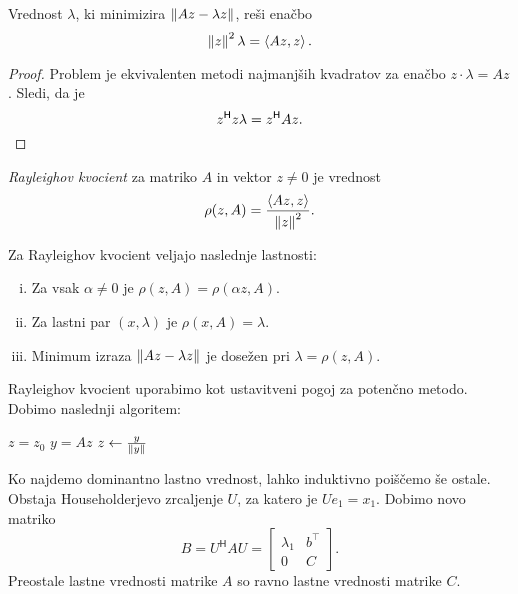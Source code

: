 \begin{trditev}
Vrednost $\lambda$, ki minimizira $\left\lVert Az - \lambda z\right\rVert$, reši
enačbo
\[
\left\lVert z\right\rVert^2 \lambda = \left\langle Az, z\right\rangle.
\]
\end{trditev}

\begin{proof}
Problem je ekvivalenten metodi najmanjših kvadratov za enačbo
$z \cdot \lambda = Az$. Sledi, da je
\[
z^\mathsf{H} z \lambda = z^\mathsf{H} Az. \qedhere
\]
\end{proof}

\begin{definicija}
\emph{Rayleighov kvocient} za matriko
$A$ in vektor $z \ne 0$ je vrednost
\[
\rho(z,A) = \frac{\left\langle Az,z\right\rangle}{\left\lVert z\right\rVert^2}.
\]
\end{definicija}

\begin{trditev}
Za Rayleighov kvocient veljajo naslednje lastnosti:

\begin{enumerate}[i)]
\item Za vsak $\alpha \ne 0$ je $\rho(z, A) = \rho(\alpha z, A)$.
\item Za lastni par $(x, \lambda)$ je $\rho(x, A) = \lambda$.
\item Minimum izraza $\left\lVert Az - \lambda z\right\rVert$ je dosežen pri
$\lambda = \rho(z, A)$.
\end{enumerate}
\end{trditev}

\obvs

\begin{opomba}
Rayleighov kvocient uporabimo kot ustavitveni pogoj za potenčno
metodo. Dobimo naslednji algoritem:

\begin{algorithmic}[1]
\State $z = z_0$
  \State $y = Az$
  \State $z \gets \frac{y}{\left\lVert y\right\rVert}$
\EndWhile
\end{algorithmic}
\end{opomba}

\begin{opomba}
Ko najdemo dominantno lastno vrednost, lahko induktivno poiščemo še
ostale. Obstaja Householderjevo zrcaljenje $U$, za katero je
$U e_1 = x_1$. Dobimo novo matriko
\[
B = U^\mathsf{H} A U =
\begin{bmatrix}
\lambda_1 & b^\top \\
    0     &    C
\end{bmatrix}.
\]
Preostale lastne vrednosti matrike $A$ so ravno lastne vrednosti
matrike $C$.
\end{opomba}

